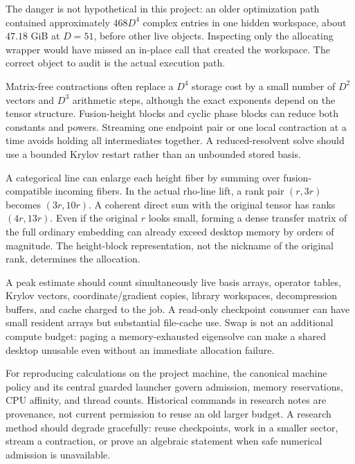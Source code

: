The danger is not hypothetical in this project: an older optimization
path contained approximately $468D^4$ complex entries in one hidden
workspace, about $47.18$ GiB at $D=51$, before other live objects.
Inspecting only the allocating wrapper would have missed an in-place
call that created the workspace. The correct object to audit is the
actual execution path.

Matrix-free contractions often replace a $D^4$ storage cost by a
small number of $D^2$ vectors and $D^3$ arithmetic steps, although
the exact exponents depend on the tensor structure. Fusion-height
blocks and cyclic phase blocks can reduce both constants and powers.
Streaming one endpoint pair or one local contraction at a time avoids
holding all intermediates together. A reduced-resolvent solve should
use a bounded Krylov restart rather than an unbounded stored basis.

\begin{example}
A categorical line can enlarge each height fiber by summing over
fusion-compatible incoming fibers. In the actual rho-line lift, a
rank pair $(r,3r)$ becomes $(3r,10r)$. A coherent direct sum with the
original tensor has ranks $(4r,13r)$. Even if the original $r$ looks
small, forming a dense transfer matrix of the full ordinary embedding
can already exceed desktop memory by orders of magnitude. The
height-block representation, not the nickname of the original rank,
determines the allocation.
\end{example}

A peak estimate should count simultaneously live basis arrays,
operator tables, Krylov vectors, coordinate/gradient copies, library
workspaces, decompression buffers, and cache charged to the job. A
read-only checkpoint consumer can have small resident arrays but
substantial file-cache use. Swap is not an additional compute
budget: paging a memory-exhausted eigensolve can make a shared desktop
unusable even without an immediate allocation failure.

For reproducing calculations on the project machine, the canonical
machine policy and its central guarded launcher govern admission,
memory reservations, CPU affinity, and thread counts. Historical
commands in research notes are provenance, not current permission
to reuse an old larger budget. A research method should degrade
gracefully: reuse checkpoints, work in a smaller sector, stream a
contraction, or prove an algebraic statement when safe numerical
admission is unavailable.

